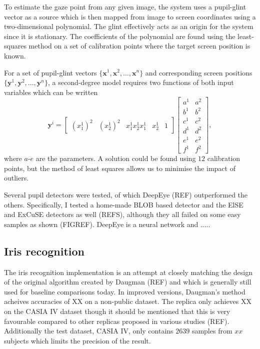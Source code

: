 To estimate the gaze point from any given image, the system uses a pupil-glint vector as a source which is then mapped from image to screen coordinates using a two-dimensional polynomial. The glint effectively acts as an origin for the system since it is stationary. The coefficients of the polynomial are found using the least-squares method on a set of calibration points where the target screen position is known.

For a set of pupil-glint vectors $\{\mathbf{x}^1, \mathbf{x}^2, \dots, \mathbf{x}^n\}$ and corresponding screen positions $\{\mathbf{y}^1, \mathbf{y}^2, \dots, \mathbf{y}^n\}$, a second-degree model requires two functions of both input variables which can be written
\begin{equation}
    \mathbf{y}^i =  \begin{bmatrix}
        \left(x_1^{1}\right)^2 & \left(x_2^{1}\right)^2 & x_1^1x_2^1 x_1^1 & x_2^1 & 1\end{bmatrix} \begin{bmatrix}a^1&a^2\\ b^1&b^2\\ c^1&c^2\\ d^1&d^2\\ e^1&e^2\\ f^1&f^2\end{bmatrix},
\end{equation}
where $a$-$e$ are the parameters. A solution could be found using $12$ calibration points, but the method of least squares allows us to minimise the impact of outliers.

Several pupil detectors were tested, of which DeepEye (REF) outperformed the others. Specifically, I tested a home-made BLOB based detector and the ElSE and ExCuSE detectors as well (REFS), although they all failed on some easy samples as shown (FIGREF). DeepEye is a neural network and .....

\subsection{Iris recognition}
The iris recognition implementation is an attempt at closely matching the design of the original algorithm created by Daugman (REF) and which is generally still used for baseline comparisons today. In improved versions, Daugman's method acheives accuracies of XX on a non-public dataset. The replica only achieves XX on the CASIA IV dataset though it should be mentioned that this is very favourable compared to other replicas proposed in various studies (REF). Additionally the test dataset, CASIA IV, only contains $2639$ samples from $xx$ subjects which limits the precision of the result.


